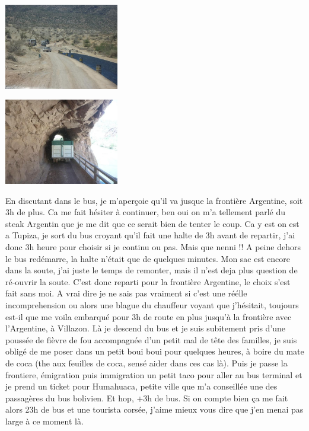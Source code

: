 \begin{multicols}{2}
\smallbreak
\hspace*{-0.65cm}
\includegraphics[width=5cm]{articles/La-paz-humahuaca-et-salaar/1257387196swjJ.jpg}
\smallbreak

\smallbreak
\hspace*{-0.65cm}
\includegraphics[width=5cm]{articles/La-paz-humahuaca-et-salaar/1257387183J7sM.jpg}
\smallbreak

En discutant dans le bus, je m'aperçoie qu'il va jusque la frontière Argentine, soit 3h de plus. Ca me fait hésiter à continuer, ben oui on m'a tellement parlé du steak Argentin que je me dit que ce serait bien de tenter le coup. Ca y est on est a Tupiza, je sort du bus croyant qu'il fait une halte de 3h avant de repartir, j'ai donc 3h heure pour choisir si je continu ou pas. Mais que nenni !! A peine dehors le bus redémarre, la halte n'était que de quelques minutes. Mon sac est encore dans la soute, j'ai juste le temps de remonter, mais il n'est deja plus question de ré-ouvrir la soute. C'est donc reparti pour la frontière Argentine, le choix s'est fait sans moi. A vrai dire je ne sais pas vraiment si c'est une réélle incomprehension ou alors une blague du chauffeur voyant que j'hésitait, toujours est-il que me voila embarqué pour 3h de route en plus jusqu'à la frontière avec l'Argentine, à Villazon. Là je descend du bus et je suis subitement pris d'une poussée de fièvre de fou accompagnée d'un petit mal de tête des familles, je suis obligé de me poser dans un petit boui boui pour quelques heures, à boire du mate de coca (the aux feuilles de coca, sensé aider dans ces cas là). Puis je passe la frontiere, émigration puis immigration un petit taco pour aller au bus terminal et je prend un ticket pour Humahuaca, petite ville que m'a conseillée une des passagères du bus bolivien. Et hop, +3h de bus. Si on compte bien ça me fait alors 23h de bus et une tourista corsée, j'aime mieux vous dire que j'en menai pas large à ce moment là.


\end{multicols}
